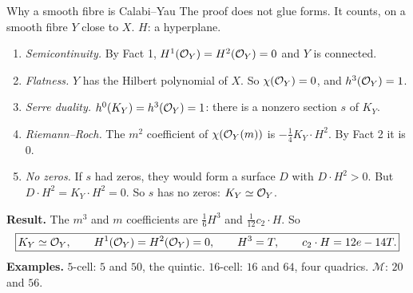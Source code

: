 \begin{frame}{Why a smooth fibre is Calabi--Yau}
The proof does not glue forms. It counts, on a smooth fibre \(Y\) close to \(X\). \(H\): a hyperplane.
\begin{enumerate}
\setlength{\itemsep}{0pt}
\item \emph{Semicontinuity.} By Fact 1, \(H^1(\mathcal O_Y)=H^2(\mathcal O_Y)=0\) and \(Y\) is connected.
\item \emph{Flatness.} \(Y\) has the Hilbert polynomial of \(X\). So \(\chi(\mathcal O_Y)=0\), and \(h^3(\mathcal O_Y)=1\).
\item \emph{Serre duality.} \(h^0(K_Y)=h^3(\mathcal O_Y)=1\): there is a nonzero section \(s\) of \(K_Y\).
\item \emph{Riemann--Roch.} The \(m^2\) coefficient of \(\chi(\mathcal O_Y(m))\) is \(-\tfrac14K_Y\cdot H^2\). By Fact 2 it is \(0\).
\item \emph{No zeros.} If \(s\) had zeros, they would form a surface \(D\) with \(D\cdot H^2>0\). But \(D\cdot H^2=K_Y\cdot H^2=0\). So \(s\) has no zeros: \(K_Y\simeq\mathcal O_Y\).
\end{enumerate}
\textbf{Result.} The \(m^3\) and \(m\) coefficients are \(\tfrac16H^3\) and \(\tfrac1{12}c_2\cdot H\). So
\[\setlength{\fboxsep}{2pt}
\boxed{K_Y\simeq\cO_Y,\qquad H^1(\cO_Y)=H^2(\cO_Y)=0,\qquad H^3=T,\qquad c_2\cdot H=12e-14T.}
\]
\textbf{Examples.} \(5\)-cell: \(5\) and \(50\), the quintic. \(16\)-cell: \(16\) and \(64\), four quadrics. \(\mathcal M\): \(20\) and \(56\).
\end{frame}

